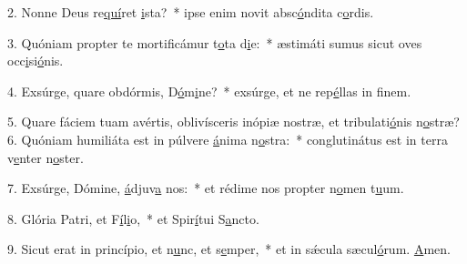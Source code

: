 2. Nonne Deus re\uline{quí}ret \uline{i}sta?~* ipse enim novit absc\uline{ó}ndita c\uline{o}rdis.\par 
3. Quóniam propter te mortificámur t\uline{o}ta d\uline{i}e:~* æstimáti sumus sicut oves occ\uline{i}si\uline{ó}nis.\par 
4. Exsúrge, quare obdórmis, D\uline{ó}m\uline{i}ne?~* exsúrge, et ne rep\uline{é}llas in f\uline{i}nem.\par 
5. Quare fáciem tuam avértis, oblivísceris inópiæ nostræ, et tribulati\uline{ó}nis n\uline{o}stræ?
6. Quóniam humiliáta est in púlvere \uline{á}nima n\uline{o}stra:~* conglutinátus est in terra v\uline{e}nter n\uline{o}ster.\par 
7. Exsúrge, Dómine, \uline{á}djuv\uline{a} nos:~* et rédime nos propter n\uline{o}men t\uline{u}um.\par 
8. Glória Patri, et F\uline{í}l\uline{i}o,~* et Spir\uline{í}tui S\uline{a}ncto.\par 
9. Sicut erat in princípio, et n\uline{u}nc, et s\uline{e}mper,~* et in sǽcula sæcul\uline{ó}rum. \uline{A}men.\par 
